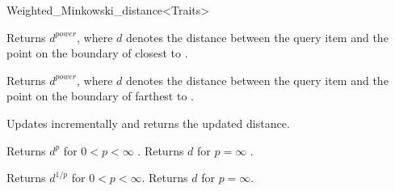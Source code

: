 \begin{ccRefClass}{Weighted_Minkowski_distance<Traits>}
\ccOperations



{Returns $d^{power}$, where $d$ denotes the distance between the query item  and
the point on the boundary of  closest to .}

{Returns $d^{power}$, where $d$ denotes the distance between the query item  and
the point on the boundary of  farthest to .}

 {Updates  incrementally
and returns the updated distance.}

 {Returns $d^p$ for $0 < p <\infty$ . Returns $d$ for $p=\infty$ .}

 {Returns $d^{1/p}$ for $0 < p <\infty$.
Returns $d$ for $p=\infty$.}
 

\ccSeeAlso

\\

\end{ccRefClass}



